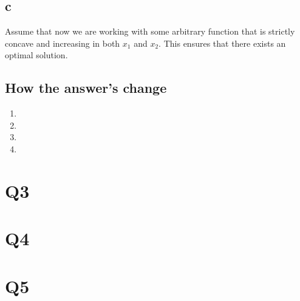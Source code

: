 \documentclass[12pt]{article}
\begin{document}
\subsection*{c}
Assume that now we are working with some arbitrary function that is
strictly concave and increasing in both $x_1$ and $x_2$. This ensures that there exists an optimal solution. 
\subsection*{How the answer's change}
\begin{enumerate}[label=\alph*., start=6]
    \item 
    \item 
    \item 
    \item 
\end{enumerate}
\section*{Q3}
\section*{Q4}
\section*{Q5}
\end{document}

